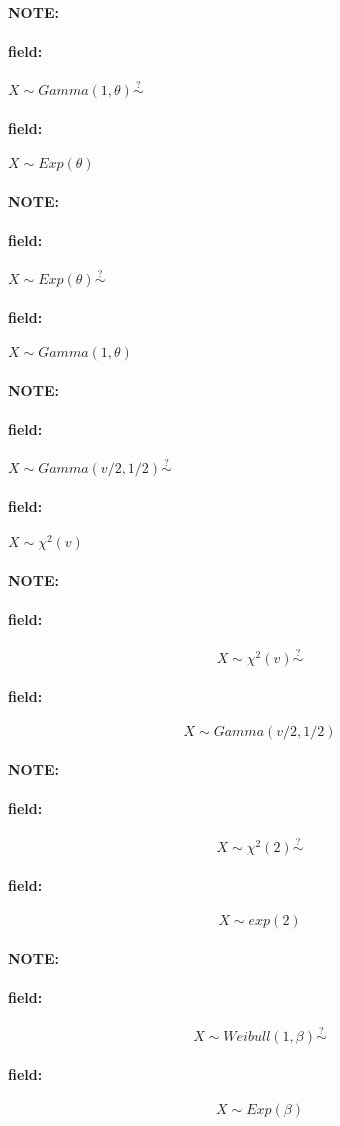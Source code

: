 \documentclass[12pt]{article}
\newenvironment{note}{\paragraph{NOTE:}}{}
\newenvironment{field}{\paragraph{field:}}{}
\begin{document}
\begin{note}
  \begin{field}
    $X \sim Gamma(1,\theta) \overset{?}{\sim}$
  \end{field}
  \begin{field}
    $X \sim Exp(\theta)$
  \end{field}
\end{note}

\begin{note}
  \begin{field}
    $X \sim Exp(\theta) \overset{?}{\sim}$
  \end{field}
  \begin{field}
    $X \sim Gamma(1,\theta)$
  \end{field}
\end{note}

\begin{note}
  \begin{field}
    $X \sim Gamma(v/2,1/2) \overset{?}{\sim} $
  \end{field}
  \begin{field}
    $X \sim \chi^2(v)$
  \end{field}
\end{note}

\begin{note}
  \begin{field}
    $$X \sim \chi^2(v) \overset{?}{\sim}$$
  \end{field}
  \begin{field}
    $$X \sim Gamma(v/2,1/2)$$

  \end{field}
\end{note}

\begin{note}
  \begin{field}
    $$ X \sim \chi^2(2) \overset{?}{\sim}$$
  \end{field}
  \begin{field}
    $$ X \sim exp(2)$$
  \end{field}
\end{note}

\begin{note}
  \begin{field}
    $$ X \sim Weibull(1,\beta) \overset{?}{\sim} $$
  \end{field}
  \begin{field}
    $$X \sim Exp(\beta)$$
  \end{field}
\end{note}
\end{document}
